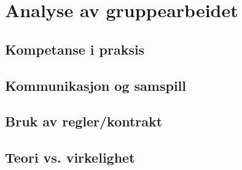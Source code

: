 

\chapter{Analyse av gruppearbeidet}
\section{Kompetanse i praksis}

\section{Kommunikasjon og samspill}

\section{Bruk av regler/kontrakt}

\section{Teori vs. virkelighet}

